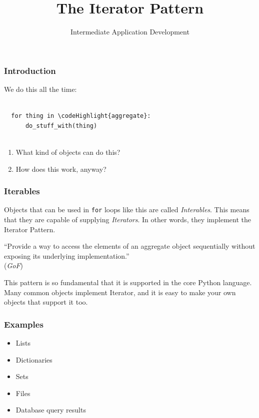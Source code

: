 \documentclass[10pt]{beamer}
\title{The Iterator Pattern}
\author[IN608]{Intermediate Application Development}
\institute[Otago Polytechnic]{
  Otago Polytechnic \\
  Dunedin, New Zealand \\
  Kaiako: Tom Clark
}
\date{}
\newcommand\codeHighlight[1]{\textcolor[rgb]{1,0,0}{\textbf{#1}}}
\begin{document}
\begin{frame}[plain]
  \titlepage
\end{frame}

\begin{frame}[fragile]
  \frametitle{Introduction}
  
  We do this all the time:
  \begin{Verbatim}[commandchars=\\\{\}]
  
  for thing in \codeHighlight{aggregate}:
      do_stuff_with(thing)
  
  \end{Verbatim}
  
  \begin{enumerate}
    \item What kind of objects can do this?
    \item How does this work, anyway?     
  \end{enumerate}  
\end{frame}

\begin{frame}
  \frametitle{Iterables}
  
  Objects that can be used in \texttt{for} loops like this are called \emph{Interables}.
  This means that they are capable of supplying \emph{Iterators}. In other words,
  they implement the Iterator Pattern.
  
  \vspace{5mm}
  ``Provide a way to access the elements of an aggregate object sequentially without exposing 
  its underlying implementation.'' \\
  (\emph{GoF})
  
  \vspace{5mm}
  This pattern is so fundamental that it is supported in the core Python language. Many common objects 
  implement Iterator, and it is easy to make your own objects that support it too.  

  
\end{frame}

\begin{frame}
  \frametitle{Examples}
  
  \begin{itemize}
    \item Lists
    \item Dictionaries
    \item Sets
    \item Files
    \item Database query results
  \end{itemize}  
       
\end{frame}
\end{document}
